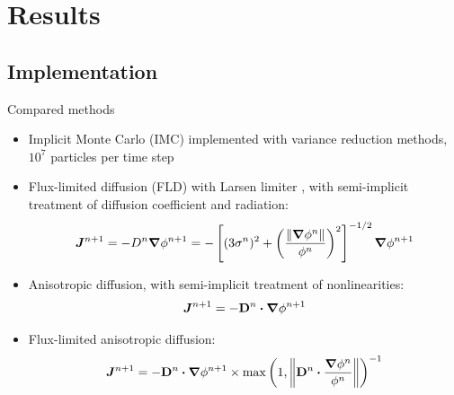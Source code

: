 \documentclass{beamer}
\begin{document}
\section{Results}
\subsection{Implementation}
\begin{frame}{Compared methods}
\begin{itemize}
  \item Implicit Monte Carlo (IMC) \cite{Fle1971} implemented with variance
    reduction methods, $10^7$ particles per time step
  \item {Fl}ux-limited diffusion (FLD) with Larsen limiter \cite{Ols2000}, with
    semi-implicit treatment of diffusion coefficient and radiation:
    \begin{equation*}
      \bm{J}^{n+1} = - D^{n} \bm{\nabla} \phi^{n+1}  = -\left[ (3\sigma^{n})^2
      + \left( \frac{\left\| \bm{\nabla} \phi^{n} \right\|}{\phi^{n}}  \right)^2 \right]^{-1/2}
      \bm{\nabla} \phi^{n+1}
    \end{equation*}
  \item Anisotropic diffusion, with semi-implicit treatment of nonlinearities:
    \begin{equation*}
      \bm{J}^{n+1} = -\mathbf{D}^{n}\bm{\cdot} \bm{\nabla} \phi^{n+1} 
    \end{equation*}
  \item Flux-limited anisotropic diffusion:
    \begin{equation*}
      \bm{J}^{n+1} = -\mathbf{D}^{n}\bm{\cdot} \bm{\nabla} \phi^{n+1} \times 
      \max\left( 1, \left\| \mathbf{D}^{n}\bm{\cdot} \frac{\bm{\nabla} \phi^{n}}{\phi^{n}} \right\|
      \right)^{-1}
    \end{equation*}
\end{itemize}
\end{frame}

\end{document}
